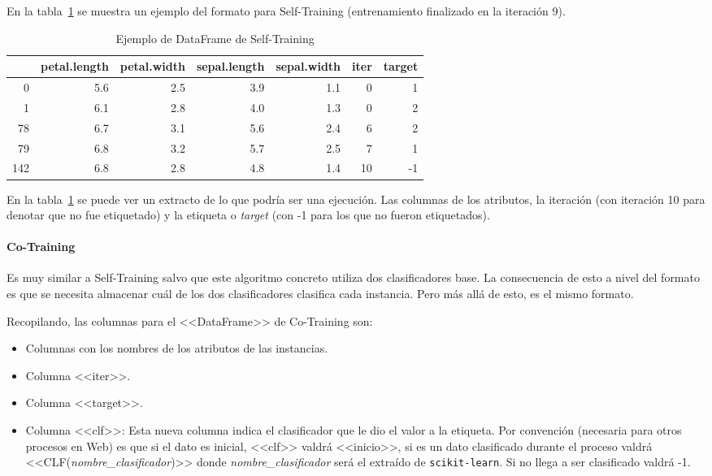 En la tabla~\ref{tabla:dataframe-st} se muestra un ejemplo del formato para
Self-Training (entrenamiento finalizado en la iteración 9).
\begin{table}[H]
\begin{tabular}{rrrrrrr}
    & petal.length & petal.width & sepal.length & sepal.width & iter & target \\ \toprule
0   & 5.6          & 2.5         & 3.9          & 1.1         & 0    & 1      \\
1   & 6.1          & 2.8         & 4.0          & 1.3         & 0    & 2      \\
78  & 6.7          & 3.1         & 5.6          & 2.4         & 6    & 2      \\
79  & 6.8          & 3.2         & 5.7          & 2.5         & 7    & 1      \\
142 & 6.8          & 2.8         & 4.8          & 1.4         & 10   & -1    
\end{tabular}
\caption{Ejemplo de DataFrame de Self-Training}
\label{tabla:dataframe-st}
\end{table}

En la tabla~\ref{tabla:dataframe-st} se puede ver un extracto de lo que podría
ser una ejecución. Las columnas de los atributos, la iteración (con iteración 10
para denotar que no fue etiquetado) y la etiqueta o \textit{target} (con -1 para
los que no fueron etiquetados).

\paragraph{Co-Training}
Es muy similar a Self-Training salvo que este algoritmo concreto utiliza dos
clasificadores base. La consecuencia de esto a nivel del formato es que se
necesita almacenar cuál de los dos clasificadores clasifica cada instancia. Pero
más allá de esto, es el mismo formato.

Recopilando, las columnas para el <<DataFrame>> de Co-Training son:
\begin{itemize}
    \item Columnas con los nombres de los atributos de las instancias.
    \item Columna <<iter>>.
    \item Columna <<target>>.
    \item Columna <<clf>>: Esta nueva columna indica el clasificador que le dio
    el valor  a la etiqueta. Por convención (necesaria para otros procesos en
    Web) es que si el dato es inicial, <<clf>> valdrá <<inicio>>, si es un dato
    clasificado durante el proceso valdrá <<CLF(\textit{nombre\_clasificador})>>
    donde \textit{nombre\_clasificador} será el extraído de
    \texttt{scikit-learn}. Si no llega a ser clasificado valdrá -1.
\end{itemize}

